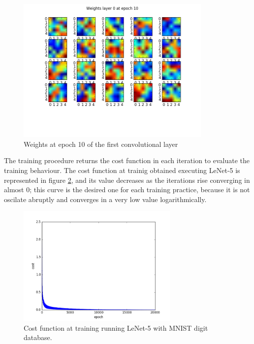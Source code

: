 \begin{figure}[htb]
\centering
\includegraphics[width=0.85\textwidth]{images/images_lenet/w_layer0_epoch10.png}
\caption{Weights at epoch 10 of the first convolutional layer} \label{fig:weights_lenet}
\end{figure}

The training procedure returns the cost function in each iteration to evaluate the training behaviour. The cost function at trainig obtained executing LeNet-5 is represented in figure \ref{fig:Lenetcost}, and its value decreases as the iterations rise converging in almost 0; this curve is the desired one for each training practice, because it is not oscilate abruptly and converges in a very low value logarithmically.\\

\begin{figure}[htb]
\centering
\includegraphics[width=0.7\textwidth]{images/images_lenet/cost_lenet.png}
\caption{Cost function at training running LeNet-5 with MNIST digit database.} \label{fig:Lenetcost}
\end{figure}

